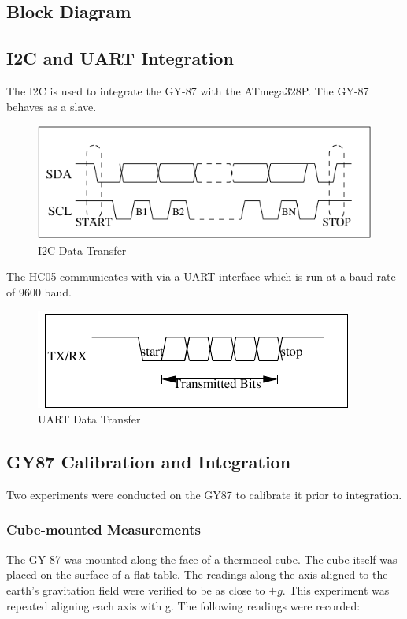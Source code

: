 \documentclass[11pt, a4paper]{article}
\begin{document}
\subsection{Block Diagram}

\subsection{I2C and UART Integration}
The I2C is used to integrate the GY-87 with the ATmega328P. The GY-87 behaves
as a slave. 

\begin{figure}[htb]
    \centering
    \includegraphics[width=\linewidth]{I2C_Timing.pdf}
    \caption{I2C Data Transfer}
    \label{fig:i2c_timing}
\end{figure}

\noindent The HC05 communicates with via a UART interface which is run at a
baud rate of 9600 baud.

\begin{figure}[htb]
    \centering
    \includegraphics[width=\linewidth]{UART_Timing.pdf}
    \caption{UART Data Transfer}
    \label{fig:uart_timing}
\end{figure}

\subsection{GY87 Calibration and Integration}
Two experiments were conducted on the GY87 to calibrate it prior to
integration.

\subsubsection{Cube-mounted Measurements}
The GY-87 was mounted along the face of a thermocol cube. The cube itself was
placed on the surface of a flat table. The readings along the axis aligned to
the earth's gravitation field were verified to be as close to $\pm g$. This
experiment was repeated aligning each axis with g. The following readings were
recorded:
\end{document}
